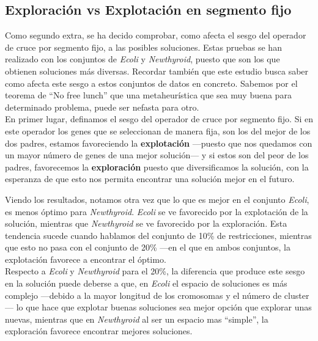 \newpage
\subsection{Exploración vs Explotación en segmento fijo}
Como segundo extra, se ha decido comprobar, como afecta el sesgo del operador de cruce por segmento fijo, a las posibles soluciones. Estas pruebas se han realizado con los conjuntos de \emph{Ecoli} y \emph{Newthyroid}, puesto que son los que obtienen soluciones más diversas. Recordar también que este estudio busca saber como afecta este sesgo a estos conjuntos de datos en concreto. Sabemos por el teorema de ``No free lunch'' que una metaheurística que sea muy buena para determinado problema, puede ser nefasta para otro.\\
En primer lugar, definamos el sesgo del operador de cruce por segmento fijo. Si en este operador los genes que se seleccionan de manera fija, son los del mejor de los dos padres, estamos favoreciendo la \textbf{explotación} ---puesto que nos quedamos con un mayor número de genes de una mejor solución--- y si estos son del peor de los padres, favorecemos la \textbf{exploración} puesto que diversificamos la solución, con la esperanza de que esto nos permita encontrar una solución mejor en el futuro.

Viendo los resultados, notamos otra vez que lo que es mejor en el conjunto \emph{Ecoli}, es menos óptimo para \emph{Newthyroid}. \emph{Ecoli} se ve favorecido por la explotación de la solución, mientras que \emph{Newthyroid} se ve favorecido por la exploración. Esta tendencia sucede cuando hablamos del conjunto de 10\% de restricciones, mientras que esto no pasa con el conjunto de 20\% ---en el que en ambos conjuntos, la explotación favorece a encontrar el óptimo.\\
Respecto a \emph{Ecoli} y \emph{Newthyroid} para el 20\%, la diferencia que produce este sesgo en la solución puede deberse a que, en \emph{Ecoli} el espacio de soluciones es más complejo ---debido a la mayor longitud de los cromosomas y el número de cluster--- lo que hace que explotar buenas soluciones sea mejor opción que explorar unas nuevas, mientras que en \emph{Newthyroid} al ser un espacio mas ``simple'', la exploración favorece encontrar mejores soluciones.


